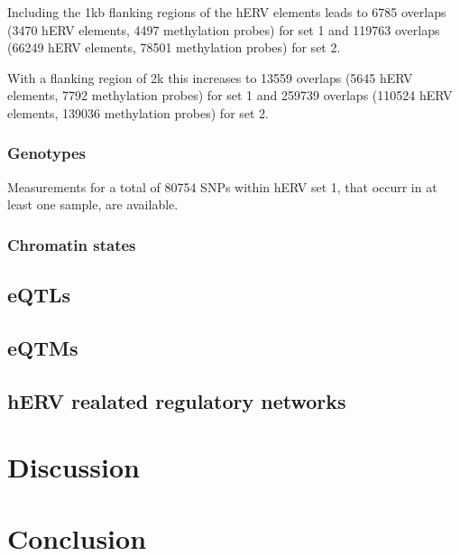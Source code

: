 \documentclass[a4paper,12pt]{article}
\begin{document}
Including the 1kb flanking regions of the hERV elements leads to 6785 overlaps (3470 hERV elements, 4497 methylation probes) for set 1 and 119763 overlaps (66249 hERV elements, 78501 methylation probes) for set 2.

With a flanking region of 2k this increases to 13559 overlaps (5645 hERV elements, 7792 methylation probes) for set 1 and 259739 overlaps (110524 hERV elements, 139036 methylation probes) for set 2. 

\subsubsection{Genotypes}
Measurements for a total of 80754 SNPs within hERV set 1, that occurr in at least one sample, are available.

\subsubsection{Chromatin states}

\subsection{eQTLs}

\subsection{eQTMs}

\subsection{hERV realated regulatory networks}

\newpage
\section{Discussion}

\newpage
\section{Conclusion}

\newpage
{}

\end{document}
